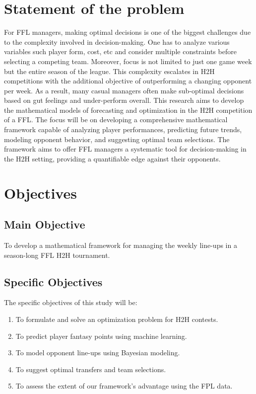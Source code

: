 \documentclass[12pt,oneside,a4paper]{book}
\theoremstyle{definition}
\theoremstyle{remark}
\begin{document}
		\section{Statement of the problem}
			For FFL managers, making optimal decisions is one of the biggest challenges due to the complexity involved in decision-making. One has to analyze various variables such player form, cost, etc and consider multiple constraints before selecting a competing team. Moreover, focus is not limited to just one game week but the entire season of the league. This complexity escalates in H2H competitions with the additional objective of outperforming a changing opponent per week. As a result, many casual managers often make sub-optimal decisions based on gut feelings and under-perform overall. This research aims to develop the mathematical models of forecasting and optimization in the H2H competition of a FFL. The focus will be on developing a comprehensive mathematical framework capable of analyzing player performances, predicting future trends, modeling opponent behavior, and suggesting optimal team selections. The framework aims to offer FFL managers a systematic tool for decision-making in the H2H setting, providing a quantifiable edge against their opponents.


		\section{Objectives}
			\subsection{Main Objective}
				To develop a mathematical framework for managing the weekly line-ups in a season-long FFL H2H tournament.

			\subsection{Specific Objectives}
				The specific objectives of this study will be:
				\begin{enumerate}
					\item[(i)] To formulate and solve an optimization problem for H2H contests.
					\item[(ii)] To predict player fantasy points using machine learning.
					\item[(iii)] To model opponent line-ups using Bayesian modeling.
					\item[(iv)] To suggest optimal transfers and team selections.
					\item[(v)] To assess the extent of our framework's advantage using the FPL data.
				\end{enumerate}
\end{document}
